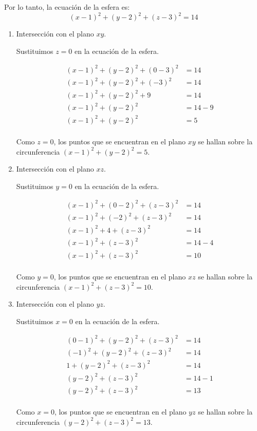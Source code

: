 \documentclass[12pt]{article}
\begin{document}
Por lo tanto, la ecuación de la esfera es: $$ (x-1)^2 + (y-2)^2 + (z-3)^2 = 14 $$

\begin{enumerate}[format=\textbf]
  
\item Intersección con el plano $xy$.
  
  Sustituimos $z = 0$ en la ecuación de la esfera.
  
  \begin{align*}
    (x-1)^2 + (y-2)^2 + (0-3)^2
    &= 14 \\
    (x-1)^2 + (y-2)^2 + (-3)^2
    &= 14 \\
    (x-1)^2 + (y-2)^2 + 9
    &= 14 \\
    (x-1)^2 + (y-2)^2
    &= 14 - 9 \\
    (x-1)^2 + (y-2)^2
    &= 5 \\
  \end{align*}
  
  Como $z = 0$, los puntos que se encuentran en el plano $xy$ se hallan sobre la circunferencia $(x-1)^2 + (y-2)^2 = 5$.
  
\item Intersección con el plano $xz$.
  
  Sustituimos $y = 0$ en la ecuación de la esfera.
  
  \begin{align*}
    (x-1)^2 + (0-2)^2 + (z-3)^2
    &= 14 \\
    (x-1)^2 + (-2)^2 + (z-3)^2
    &= 14 \\
    (x-1)^2 + 4 + (z-3)^2
    &= 14 \\
    (x-1)^2 + (z-3)^2
    &= 14 - 4 \\
    (x-1)^2 + (z-3)^2
    &= 10 \\
  \end{align*}
  
  Como $y = 0$, los puntos que se encuentran en el plano $xz$ se hallan sobre la circunferencia $(x-1)^2 + (z-3)^2 = 10$.
  
\item Intersección con el plano $yz$.
  
  Sustituimos $x = 0$ en la ecuación de la esfera.
  
  \begin{align*}
    (0-1)^2 + (y-2)^2 + (z-3)^2
    &= 14 \\
    (-1)^2 + (y-2)^2 + (z-3)^2
    &= 14 \\
    1 + (y-2)^2 + (z-3)^2
    &= 14 \\
    (y-2)^2 + (z-3)^2
    &= 14 - 1 \\
    (y-2)^2 + (z-3)^2
    &= 13 \\
  \end{align*}
  
  Como $x = 0$, los puntos que se encuentran en el plano $yz$ se hallan sobre la circunferencia $(y-2)^2 + (z-3)^2 = 13$.
  
\end{enumerate}
\end{document}
